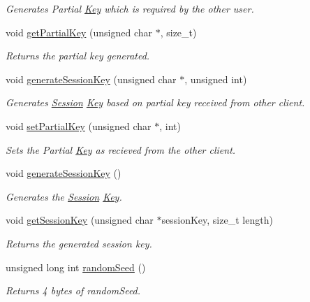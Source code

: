 \begin{DoxyCompactItemize}
\begin{DoxyCompactList}\small\item\em Generates Partial \hyperlink{structKey}{Key} which is required by the other user. \item\end{DoxyCompactList}\item 
void \hyperlink{classDHGenerator_a77e90d6b4e09770058ca1a6ad114b154}{getPartialKey} (unsigned char $\ast$, size\_\-t)
\begin{DoxyCompactList}\small\item\em Returns the partial key generated. \item\end{DoxyCompactList}\item 
void \hyperlink{classDHGenerator_a9e52156b2bfe8a0aa95f111c07e50017}{generateSessionKey} (unsigned char $\ast$, unsigned int)
\begin{DoxyCompactList}\small\item\em Generates \hyperlink{classSession}{Session} \hyperlink{structKey}{Key} based on partial key received from other client. \item\end{DoxyCompactList}\item 
void \hyperlink{classDHGenerator_a40adea2f4c5922bfe209f80b332740a9}{setPartialKey} (unsigned char $\ast$, int)
\begin{DoxyCompactList}\small\item\em Sets the Partial \hyperlink{structKey}{Key} as recieved from the other client. \item\end{DoxyCompactList}\item 
void \hyperlink{classDHGenerator_a371955b43769de8f1b5b8f61031b659e}{generateSessionKey} ()
\begin{DoxyCompactList}\small\item\em Generates the \hyperlink{classSession}{Session} \hyperlink{structKey}{Key}. \item\end{DoxyCompactList}\item 
void \hyperlink{classDHGenerator_af3d29e0133f4edb47de9350dd99d0c25}{getSessionKey} (unsigned char $\ast$sessionKey, size\_\-t length)
\begin{DoxyCompactList}\small\item\em Returns the generated session key. \item\end{DoxyCompactList}\item 
unsigned long int \hyperlink{classDHGenerator_a0251a2c6e322e718c133732c8cd01821}{randomSeed} ()
\begin{DoxyCompactList}\small\item\em Returns 4 bytes of randomSeed. \item\end{DoxyCompactList}\end{DoxyCompactItemize}


